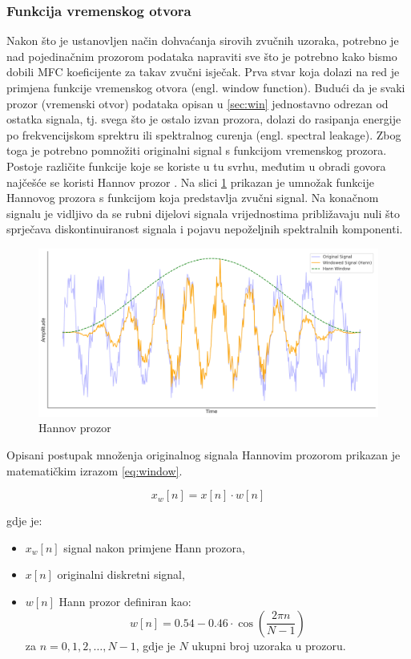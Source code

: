 \subsubsection{Funkcija vremenskog otvora}
Nakon što je ustanovljen način dohvaćanja sirovih zvučnih uzoraka, potrebno je
nad pojedinačnim prozorom podataka napraviti sve što je potrebno kako bismo
dobili MFC koeficijente za takav zvučni isječak. Prva stvar koja dolazi na red 
je primjena funkcije vremenskog otvora (engl. window function). Budući da je svaki
prozor (vremenski otvor) podataka opisan u \ref{sec:win} jednostavno odrezan od ostatka
signala, tj. svega što je ostalo izvan prozora, dolazi do rasipanja energije po
frekvencijskom sprektru ili spektralnog curenja (engl. spectral leakage). 
Zbog toga je potrebno pomnožiti originalni signal s funkcijom vremenskog prozora. Postoje
različite funkcije koje se koriste u tu svrhu, međutim u obradi govora najčešće se koristi
Hannov prozor \cite{windowing}.
Na slici \ref{pic:hann} prikazan je umnožak funkcije Hannovog prozora s funkcijom
koja predstavlja zvučni signal. Na konačnom signalu je vidljivo da se rubni dijelovi
signala vrijednostima približavaju nuli što sprječava diskontinuiranost signala i pojavu 
nepoželjnih spektralnih komponenti.

\begin{figure}[htb]
    \centering
    \includegraphics[width=0.8\linewidth]{Chapters/struktura_sustava/generiranje_znacajki/hann.png} 
    \caption{Hannov prozor}
    \label{pic:hann}
\end{figure}

Opisani postupak množenja originalnog signala Hannovim prozorom prikazan je 
matematičkim izrazom \ref{eq:window}.

\begin{equation}
    \label{eq:window}
    x_w[n] = x[n] \cdot w[n]
\end{equation}

gdje je:
\begin{itemize}
    \item \( x_w[n] \) signal nakon primjene Hann prozora,
    \item \( x[n] \) originalni diskretni signal,
    \item \( w[n] \) Hann prozor definiran kao:
    \begin{equation}
        w[n] = 0.54 - 0.46 \cdot \cos\left( \frac{2 \pi n}{N-1} \right)
    \end{equation}
    za \( n = 0, 1, 2, \dots, N-1 \),
    gdje je \( N \) ukupni broj uzoraka u prozoru.
\end{itemize}

